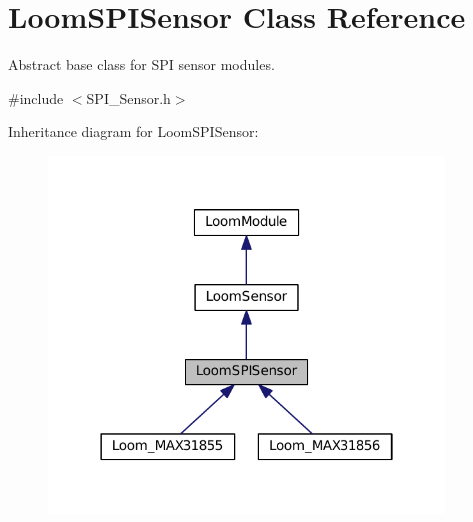\hypertarget{class_loom_s_p_i_sensor}{}\section{Loom\+S\+P\+I\+Sensor Class Reference}
\label{class_loom_s_p_i_sensor}


Abstract base class for S\+PI sensor modules.  




{\ttfamily \#include $<$S\+P\+I\+\_\+\+Sensor.\+h$>$}



Inheritance diagram for Loom\+S\+P\+I\+Sensor\+:\nopagebreak
\begin{figure}[H]
\begin{center}
\leavevmode
\includegraphics[width=298pt]{class_loom_s_p_i_sensor__inherit__graph}
\end{center}
\end{figure}

